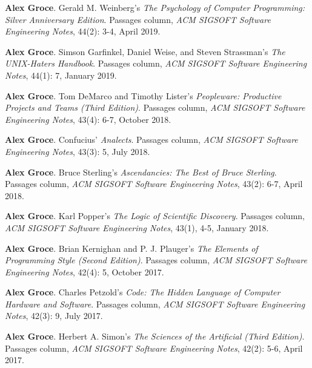 \documentclass[ComputerScience]{vita}
\begin{document}
\begin{vita}
\begin{Columns, Book Reviews, and Magazine Articles}
\item {\bf Alex Groce}. 
\newblock Gerald M. Weinberg's \emph{The Psychology of Computer
  Programming: Silver Anniversary Edition}.
\newblock Passages column, \emph{ACM SIGSOFT Software Engineering
  Notes}, 44(2): 3-4, April 2019.
  
\item {\bf Alex Groce}.
\newblock Simson Garfinkel, Daniel Weise, and Steven Strassman's \emph{The UNIX-Haters Handbook}. 
\newblock Passages column, \emph{ACM SIGSOFT Software Engineering 
  Notes}, 44(1): 7, January 2019.

\item {\bf Alex Groce}. 
\newblock Tom DeMarco and Timothy Lister's \emph{Peopleware: Productive Projects and Teams (Third Edition)}. 
\newblock Passages column, \emph{ACM SIGSOFT Software Engineering 
  Notes}, 43(4): 6-7, October 2018.

\item {\bf Alex Groce}. 
\newblock Confucius' \emph{Analects}. 
\newblock Passages column, \emph{ACM SIGSOFT Software Engineering 
  Notes}, 43(3): 5, July 2018.

\item {\bf Alex Groce}. 
\newblock Bruce Sterling's \emph{Ascendancies: The Best of Bruce Sterling}. 
\newblock Passages column, \emph{ACM SIGSOFT Software Engineering Notes}, 43(2): 6-7, April 2018.

\item {\bf Alex Groce}.
\newblock Karl Popper's \emph{The Logic of Scientific Discovery}.
\newblock Passages column, \emph{ACM SIGSOFT Software Engineering Notes}, 43(1), 4-5, January 2018.

\item {\bf Alex Groce}.
\newblock Brian Kernighan and P. J. Plauger's \emph{The Elements of Programming Style (Second Edition)}.
\newblock Passages column, \emph{ACM SIGSOFT Software Engineering Notes}, 42(4): 5, October 2017.

\item {\bf Alex Groce}.
\newblock Charles Petzold's \emph{Code: The Hidden Language of Computer Hardware and Software}.
\newblock Passages column, \emph{ACM SIGSOFT Software Engineering Notes}, 42(3): 9, July 2017.


\item {\bf Alex Groce}.
\newblock Herbert A. Simon's \emph{The Sciences of the Artificial (Third Edition)}.
\newblock Passages column, \emph{ACM SIGSOFT Software Engineering Notes}, 42(2): 5-6, April 2017.


\end{Columns, Book Reviews, and Magazine Articles}
\end{vita}
\end{document}
